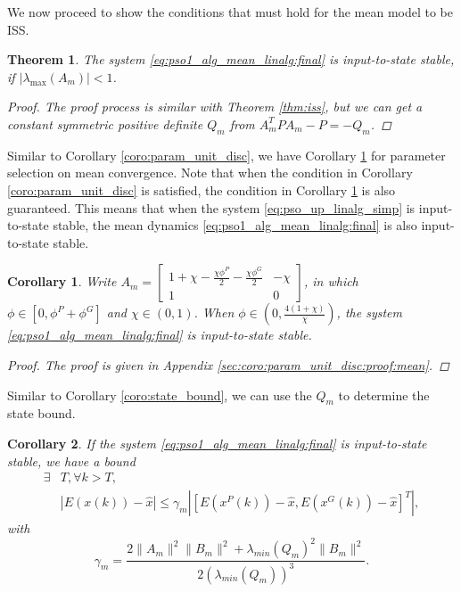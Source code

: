 \documentclass{sig-alternate}
\newtheorem{mythm}{Theorem}
\newtheorem{mycoro}{Corollary}
\begin{document}
We now proceed to show the conditions that must hold for the mean model to be ISS.
\begin{mythm}
\label{thm:iss:mean}
	The system \eqref{eq:pso1_alg_mean_linalg:final} is input-to-state stable, if $ | \lambda_{\max} ( A_{m} ) | < 1 $.
	\begin{proof}
		The proof process is similar with Theorem \ref{thm:iss}, but we can get a constant symmetric positive definite $ Q_{m} $ from $ A_{m}^{T} P A_{m} - P = - Q_{m} $.
	\end{proof}
\end{mythm}


Similar to Corollary \ref{coro:param_unit_disc}, we have Corollary \ref{coro:param_unit_disc:mean} for parameter selection on mean convergence.
Note that when the condition in Corollary \ref{coro:param_unit_disc} is satisfied, the condition in Corollary \ref{coro:param_unit_disc:mean} is also guaranteed.
This means that when the system \eqref{eq:pso_up_linalg_simp} is input-to-state stable, the mean dynamics \eqref{eq:pso1_alg_mean_linalg:final} is also input-to-state stable.

\begin{mycoro}
\label{coro:param_unit_disc:mean}
Write $ A_{m} = \begin{bmatrix}
1 + \chi - \frac{ \chi \phi^{P} }{2} - \frac{ \chi \phi^{G} }{2} & -\chi \\
1 & 0
\end{bmatrix} 
$, in which
$ \phi \in [0,  \phi^{P} + \phi^{G} ] $ and $ \chi \in ( 0, 1 ) $.
When $ \phi \in \left( 0 , \frac{4(1+\chi)}{\chi} \right) $, the system \eqref{eq:pso1_alg_mean_linalg:final} is input-to-state stable.
\begin{proof}
The proof is given in Appendix \ref{sec:coro:param_unit_disc:proof:mean}.
\end{proof}
\end{mycoro}


Similar to Corollary \ref{coro:state_bound}, we can use the $ Q_{m} $ to determine the state bound.
\begin{mycoro}
\label{coro:bound:mean}
If the system \eqref{eq:pso1_alg_mean_linalg:final} is input-to-state stable, we have a bound 
\begin{equation}
\begin{aligned}
\exists & T , \forall  k > T, \\
& | E( x(k) ) - \hat{x} | \leq  \gamma_{m} | [ E( x^{P}(k) ) - \hat{x} ,  E( x^{G}(k) ) - \hat{x} ]^{T} |,
\end{aligned}
\end{equation}
with 
\begin{equation}
\gamma_{m} = \frac{ 2 \lVert A_{m} \rVert^{2} \lVert B_{m} \rVert^{2} + \lambda_{min}( Q_{m} )^{2} \lVert B_{m} \rVert^{2} }{ 2( \lambda_{min}( Q_{m} ) )^{3} }.
\end{equation}
\end{mycoro}
\end{document}
